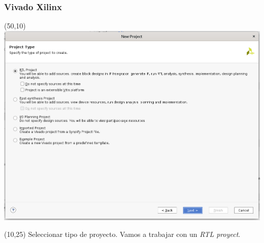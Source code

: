 \documentclass[aspectratio=169]{beamer}
\begin{document}
\begin{frame}[fragile,t]
    \frametitle{Vivado Xilinx}
    \begin{textblock}{75}(50,10) \includegraphics[scale=0.27]{img/vivado/03_proyect_type.png} \end{textblock}
    \begin{textblock}{38}(10,25) \small
    Seleccionar tipo de proyecto. Vamos a trabajar con un \emph{RTL proyect}.
    \end{textblock}
\end{frame}
    
\end{document}
